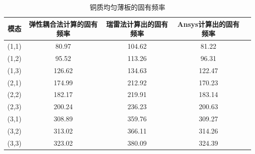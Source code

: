 \documentclass[withoutpreface,bwprint]{cumcmthesis} %
\begin{document}
\begin{table}[htb]
\centering
\caption{铜质均匀薄板的固有频率}
\label{table1}
\begin{tabular}{@{}ccccc@{}}
\toprule
\textbf{模态} & \textbf{弹性耦合法计算的固有频率} & \textbf{瑞雷法计算出的固有频率} & \textbf{Ansys计算出的固有频率}  \\
\midrule
(1,1) & 80.97 &104.62 & 81.22 \\
(1,2)& 95.52 & 113.26  & 96.31 \\
(1,3) & 126.62 & 134.63 & 122.47 \\
(2,1) & 174.99 & 212.92 & 170.23 \\
(2,2) & 182.17  & 219.91 & 183.14 \\
(2,3) & 200.24  & 236.23 & 200.63 \\
(3,1) & 308.89  & 359.76 & 309.27 \\
(3,2) & 313.02  & 366.11 & 314.26 \\
(3,3) & 323.02  & 380.09 & 324.39 \\
\bottomrule
\end{tabular}\label{lizi}
\end{table}
\end{document}
